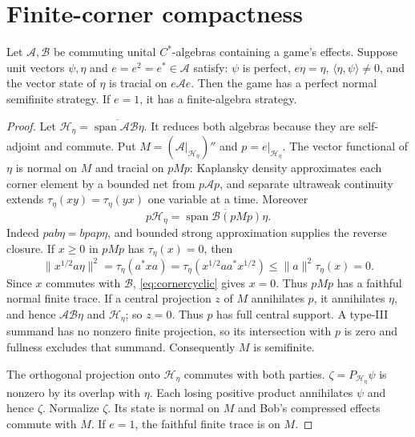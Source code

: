 
\section{Finite-corner compactness}\label{sec:upper}
\begin{lemma}\label{lem:overlap}
Let $\mathcal A,\mathcal B$ be commuting unital $C^*$-algebras containing
a game's effects. Suppose unit vectors $\psi,\eta$ and
$e=e^2=e^*\in\mathcal A$ satisfy: $\psi$ is perfect, $e\eta=\eta$,
$\langle\eta,\psi\rangle\ne0$, and the vector state of $\eta$ is tracial
on $e\mathcal A e$. Then the game has a perfect normal semifinite
strategy. If $e=1$, it has a finite-algebra strategy.
\end{lemma}
\begin{proof}
Let $\mathcal H_\eta=\overline{\operatorname{span}\mathcal A\mathcal B\eta}$.
It reduces both algebras because they are self-adjoint and commute.
Put $M=(\mathcal A|_{\mathcal H_\eta})''$ and $p=e|_{\mathcal H_\eta}$. The vector functional of $\eta$
is normal on $M$ and tracial on $pMp$: Kaplansky density approximates
each corner element by a bounded net from $p\mathcal A p$, and separate
ultraweak continuity extends $\tau_\eta(xy)=\tau_\eta(yx)$ one variable
at a time. Moreover
\begin{equation}\label{eq:cornercyclic}
 p\mathcal H_\eta=\overline{\operatorname{span}\mathcal B(pMp)\eta}.
\end{equation}
Indeed $pab\eta=bpap\eta$, and bounded strong approximation supplies the
reverse closure. If $x\geq0$ in $pMp$ has $\tau_\eta(x)=0$, then
\[
 \|x^{1/2}a\eta\|^2=\tau_\eta(a^*xa)
 =\tau_\eta(x^{1/2}aa^*x^{1/2})\leq\|a\|^2\tau_\eta(x)=0.
\]
Since $x$ commutes with $\mathcal B$, \eqref{eq:cornercyclic} gives $x=0$.
Thus $pMp$ has a faithful normal finite trace.
If a central projection $z$ of $M$ annihilates $p$, it annihilates
$\eta$, and hence $\mathcal A\mathcal B\eta$ and $\mathcal H_\eta$; so $z=0$.
Thus $p$ has full central support. A type-III summand has no nonzero
finite projection, so its intersection with $p$ is zero and fullness
excludes that summand. Consequently $M$ is semifinite.

The orthogonal projection onto $\mathcal H_\eta$ commutes with both parties.
$\zeta=P_{\mathcal H_\eta}\psi$ is nonzero by its overlap with $\eta$.
Each losing positive product annihilates $\psi$ and hence $\zeta$.
Normalize $\zeta$. Its state is normal on $M$ and Bob's compressed
effects commute with $M$. If $e=1$, the faithful finite trace is on $M$.
\end{proof}

